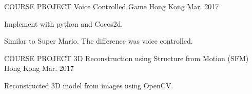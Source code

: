


\begin{cventries}


\cventry
{COURSE PROJECT} %
{Voice Controlled Game} %
{Hong Kong} %
{Mar. 2017} %
{ %
\begin{cvitems}
\item {Implement with python and Cocos2d.}
\item {Similar to Super Mario. The difference was voice controlled.}
\end{cvitems}
}


\cventry
{COURSE PROJECT} %
{3D Reconstruction using Structure from Motion (SFM)}
{Hong Kong} %
{Mar. 2017} %
{ %
\begin{cvitems}
\item {Reconstructed 3D model from images using OpenCV.}
\end{cvitems}
}




\end{cventries}